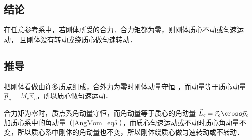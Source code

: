
\subsection{结论}
在任意参考系中，若刚体所受的合力，合力矩都为零，则刚体质心不动或匀速运动， 且刚体没有转动或绕质心做匀速转动．

\subsection{推导}
把刚体看做由许多质点组成，合外力为零时刚体动量守恒%
，而动量等于质心动量
$\vec p_c = M_c \vec v_c$，所以质心做匀速运动．

合力矩为零时，质点系角动量守恒，而角动量等于质心的角动量 $\vec L_c =\vec r_c\cross \vec p_c$ 加质心系中的角动量（\autoref{AngMom_eq5}），而质心匀速运动或不动时质心角动量不变，所以质心系中刚体的角动量也不变，所以刚体绕质心做匀速转动或不转动．
